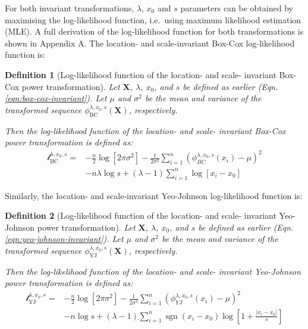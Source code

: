 \documentclass[
  a4paper,
]{article}
\newtheorem*{definition}{Definition}
\begin{document}
For both invariant transformations, \(\lambda\), \(x_0\) and \(s\)
parameters can be obtained by maximising the log-likelihood function,
i.e.~using maximum likelihood estimation (MLE). A full derivation of the
log-likelihood function for both transformations is shown in Appendix A.
The location- and scale-invariant Box-Cox log-likelihood function is:

\begin{definition} [Log-likelihood function of the location- and scale- invariant Box-Cox power transformation]
Let $\mathbf{X}$, $\lambda$, $x_0$, and $s$ be defined as earlier (Eqn. \ref{eqn:box-cox-invariant}).
Let $\mu$ and $\sigma^2$ be the mean and variance of the transformed sequence $\phi_{\text{BC}}^{\lambda, x_0, s} (\mathbf{X})$, respectively.

Then the log-likelihood function of the location- and scale- invariant Box-Cox power transformation is defined as:
\begin{equation}
\label{eqn:box-cox-invariant-log-likelihood}
\begin{split}
\mathcal{l}_{\text{BC}}^{\lambda, x_0, s} = & -\frac{n}{2} \log \left[2 \pi \sigma^2 \right] -\frac{1}{2 \sigma^2} \sum_{i=1}^n \left( \phi_{BC}^{\lambda, x_0, s}(x_i) - \mu \right)^2 \\
& -n \lambda \log s + \left( \lambda - 1 \right) \sum_{i=1}^n \log \left[ x_i - x_0 \right]
\end{split}
\end{equation}
\end{definition}

Similarly, the location- and scale-invariant Yeo-Johnson log-likelihood
function is:

\begin{definition}[Log-likelihood function of the location- and scale- invariant Yeo-Johnson power transformation]
Let $\mathbf{X}$, $\lambda$, $x_0$, and $s$ be defined as earlier (Eqn. \ref{eqn:yeo-johnson-invariant}).
Let $\mu$ and $\sigma^2$ be the mean and variance of the transformed sequence $\phi_{\text{YJ}}^{\lambda, x_0, s} (\mathbf{X})$, respectively.

Then the log-likelihood function of the location- and scale- invariant Yeo-Johnson power transformation is defined as:
\begin{equation}
\label{eqn:yeo-johnson-invariant-log-likelihood}
\begin{split}
\mathcal{l}_{\text{YJ}}^{\lambda, x_0, s} = & -\frac{n}{2} \log\left[2 \pi \sigma^2\right] -\frac{1}{2 \sigma^2} \sum_{i=1}^n \left( \phi_{YJ}^{\lambda, x_0, s}(x_i) - \mu \right)^2 \\
& - n \log s + (\lambda - 1) \sum_{i=1}^n \mathop{\mathrm{sgn}}(x_i - x_0) \log \left[1 + \frac{|x_i - x_0|}{s} \right]
\end{split}
\end{equation}
\end{definition}
\end{document}
